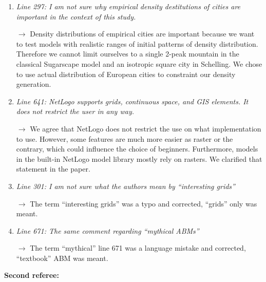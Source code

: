 \documentclass[11pt,a4paper,sans]{moderncv}        %
\begin{document}
\begin{enumerate}
	\item \textit{Line 297: I am not sure why empirical density destitutions of cities are important in the context of this study.}

	\medskip
	
	$\rightarrow$ Density distributions of empirical cities are important because we want to test models with realistic ranges of initial patterns of density distribution. Therefore we cannot limit ourselves to a single 2-peak mountain in the classical Sugarscape model and an isotropic square city in Schelling. We chose to use actual distribution of European cities to constraint our density generation.
	\bigskip
	
	
	\item \textit{Line 641: NetLogo supports grids, continuous space, and GIS elements. It does not restrict the user in any way.}
	
	\medskip
	
	$\rightarrow$ We agree that NetLogo does not restrict the use on what implementation to use. However, some features are much more easier as raster or the contrary, which could influence the choice of beginners. Furthermore, models in the built-in NetLogo model library mostly rely on rasters. We clarified that statement in the paper.
	
	\bigskip
	
	\item \textit{Line 301: I am not sure what the authors mean by “interesting grids”}
	
	\medskip
	
	$\rightarrow$ The term ``interesting grids'' was a typo and corrected, ``grids'' only was meant.
	\bigskip
		
	\item \textit{Line 671: The same comment regarding “mythical ABMs”}
	
	\medskip
	
	$\rightarrow$ The term ``mythical'' line 671 was a language mistake and corrected, ``textbook'' ABM was meant.
\end{enumerate}


\bigskip
\bigskip



\textbf{Second referee: }

\bigskip
\bigskip

\end{document}

